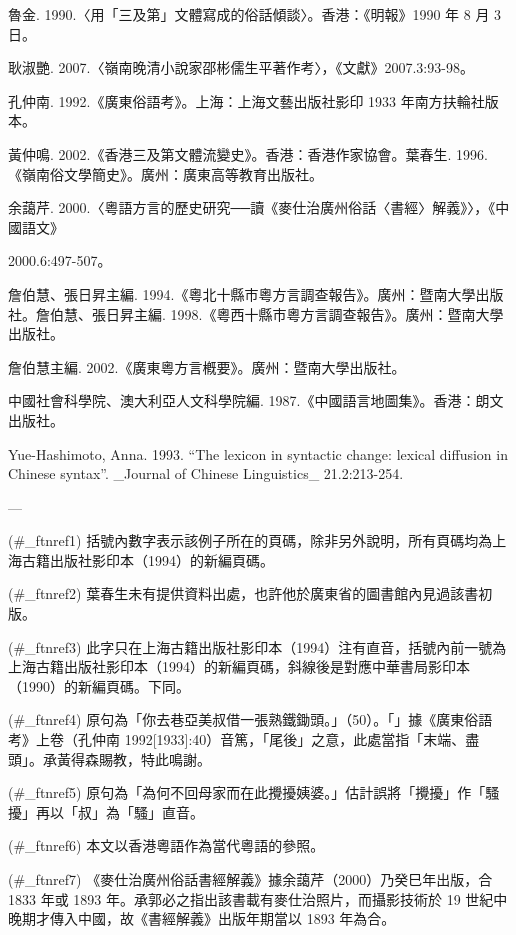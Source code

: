 魯金. 1990.〈用「三及第」文體寫成的俗話傾談〉。香港：《明報》1990 年 8 月 3 日。

耿淑艷. 2007.〈嶺南晚清小說家邵彬儒生平著作考〉，《文獻》2007.3:93-98。

孔仲南. 1992.《廣東俗語考》。上海：上海文藝出版社影印 1933 年南方扶輪社版本。

黃仲鳴. 2002.《香港三及第文體流變史》。香港：香港作家協會。葉春生. 1996.《嶺南俗文學簡史》。廣州：廣東高等教育出版社。

余藹芹. 2000.〈粵語方言的歷史研究──讀《麥仕治廣州俗話〈書經〉解義》〉，《中國語文》

2000.6:497-507。

詹伯慧、張日昇主編. 1994.《粵北十縣市粵方言調查報告》。廣州：暨南大學出版社。詹伯慧、張日昇主編. 1998.《粵西十縣市粵方言調查報告》。廣州：暨南大學出版社。

詹伯慧主編. 2002.《廣東粵方言槪要》。廣州：暨南大學出版社。

中國社會科學院、澳大利亞人文科學院編. 1987.《中國語言地圖集》。香港：朗文出版社。

Yue-Hashimoto, Anna. 1993. “The lexicon in syntactic change: lexical diffusion in Chinese syntax”. _Journal of Chinese Linguistics_ 21.2:213-254.

  

---

(#_ftnref1) 括號內數字表示該例子所在的頁碼，除非另外說明，所有頁碼均為上海古籍出版社影印本（1994）的新編頁碼。

(#_ftnref2) 葉春生未有提供資料出處，也許他於廣東省的圖書館內見過該書初版。

(#_ftnref3) 此字只在上海古籍出版社影印本（1994）注有直音，括號內前一號為上海古籍出版社影印本（1994）的新編頁碼，斜線後是對應中華書局影印本（1990）的新編頁碼。下同。

(#_ftnref4) 原句為「你去巷亞美叔借一張熟鐵鋤頭。」（50）。「」據《廣東俗語考》上卷（孔仲南 1992[1933]:40）音篤，「尾後」之意，此處當指「末端、盡頭」。承黃得森賜教，特此鳴謝。

(#_ftnref5) 原句為「為何不回母家而在此攪擾姨婆。」估計誤將「攪擾」作「騷擾」再以「叔」為「騷」直音。

(#_ftnref6) 本文以香港粵語作為當代粵語的參照。

(#_ftnref7) 《麥仕治廣州俗話書經解義》據余藹芹（2000）乃癸巳年出版，合 1833 年或 1893 年。承郭必之指出該書載有麥仕治照片，而攝影技術於 19 世紀中晚期才傳入中國，故《書經解義》出版年期當以 1893 年為合。